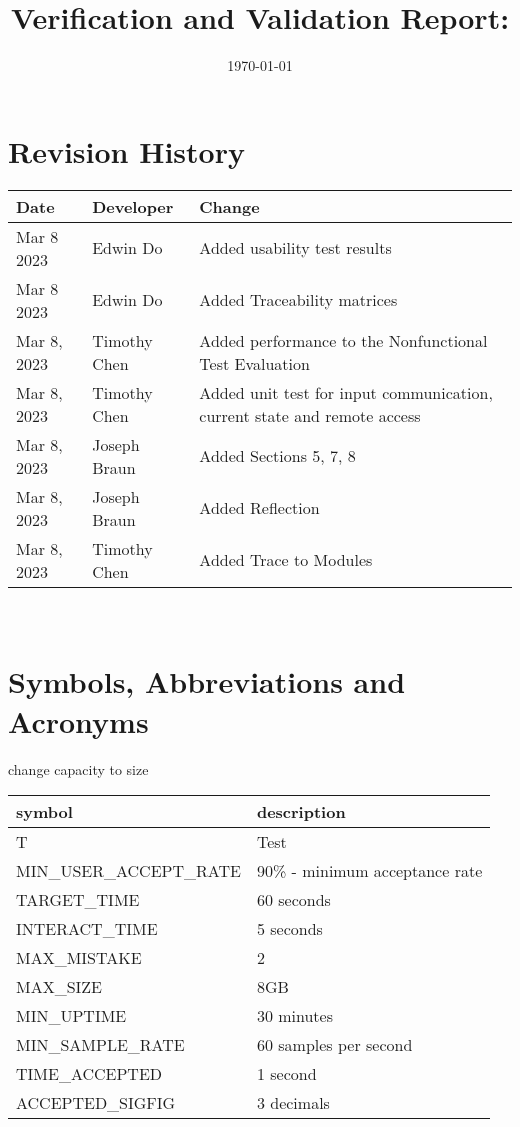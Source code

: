\documentclass[12pt, titlepage]{article}
\begin{document}
\title{Verification and Validation Report: \progname} 
\author{\authname}
\date{\today}
	
\maketitle


\section{Revision History}


\begin{tabularx}{\textwidth}{p{3cm}p{3cm}X}
\toprule {\bf Date} & {\bf Developer} & {\bf Change}\\
\midrule
Mar 8 2023 & Edwin Do & Added usability test results \\
Mar 8 2023 & Edwin Do & Added Traceability matrices \\
Mar 8, 2023 & Timothy Chen & Added performance to the Nonfunctional Test Evaluation\\
Mar 8, 2023 & Timothy Chen & Added unit test for input communication, current state and remote access\\
Mar 8, 2023 & Joseph Braun & Added Sections 5, 7, 8 \\
Mar 8, 2023 & Joseph Braun & Added Reflection \\
Mar 8, 2023 & Timothy Chen & Added Trace to Modules \\
\bottomrule
\end{tabularx}

~\newpage

\section{Symbols, Abbreviations and Acronyms}
change capacity to size

\renewcommand{\arraystretch}{1.2}
\begin{tabular}{l l} 
  \toprule		
  \textbf{symbol} & \textbf{description}\\
  \midrule 
  T & Test\\
  MIN\_USER\_ACCEPT\_RATE & 90\% - minimum acceptance rate\\
  TARGET\_TIME & 60 seconds \\
  INTERACT\_TIME & 5 seconds \\
  MAX\_MISTAKE & 2 \\
  MAX\_SIZE & 8GB \\ 
  MIN\_UPTIME & 30 minutes \\ 
  MIN\_SAMPLE\_RATE & 60 samples per second\\
  TIME\_ACCEPTED & 1 second \\
  ACCEPTED\_SIGFIG & 3 decimals \\
  \bottomrule
\end{tabular}\\
\end{document}
